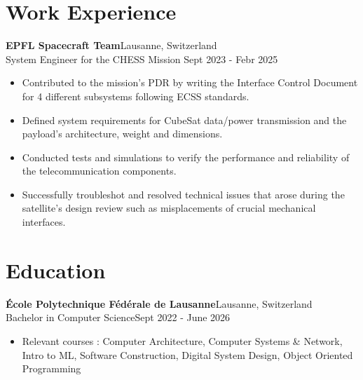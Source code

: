 \documentclass[a4paper, 10pt]{article}
\newenvironment{highlights}{
    \begin{itemize}[
        topsep=0.10 cm,
        parsep=0.10 cm,
        partopsep=0pt,
        itemsep=0pt,
        leftmargin=0.4 cm + 10pt
    ]
}{
    \end{itemize}
} %
\let\hrefWithoutArrow\href
\renewcommand{\href}[2]{\hrefWithoutArrow{#1}{\ifthenelse{\equal{#2}{}}{ }{#2 }\raisebox{.15ex}{\footnotesize \faExternalLink*}}}
\begin{document}
    \section{Work Experience}
        \textbf{EPFL Spacecraft Team}\href{https://www.epflspacecraftteam.ch/}{}\hfill Lausanne, Switzerland\\
        {System Engineer for the CHESS Mission} \hfill Sept 2023 - Febr 2025
        \begin{highlights}
            \item Contributed to the mission's PDR by writing the Interface Control Document for 4 different subsystems following ECSS standards.
            \item Defined system requirements for CubeSat data/power transmission and the payload’s architecture, weight and dimensions.
            \item Conducted tests and simulations to verify the performance and reliability of the telecommunication components.
            \item Successfully troubleshot and resolved technical issues that arose during the satellite's design review such as misplacements of crucial mechanical interfaces.
        \end{highlights}
        
    \section{Education}
        \textbf{École Polytechnique Fédérale de Lausanne}\hfill Lausanne, Switzerland\\
        Bachelor in Computer Science\hfill Sept 2022 - June 2026
        \begin{highlights}
            \item Relevant courses : Computer Architecture, Computer Systems \& Network, Intro to ML, Software Construction, Digital System Design, Object Oriented Programming
            
        \end{highlights}
            
    
\end{document}
